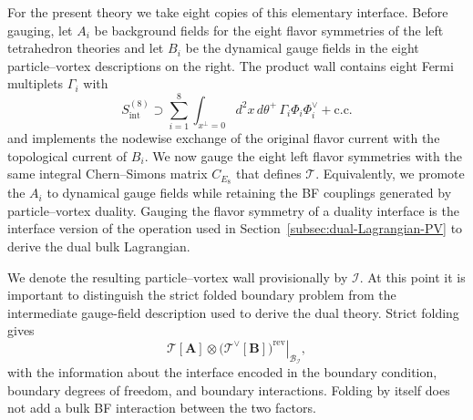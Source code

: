 \documentclass[11pt,a4paper]{article}
\numberwithin{equation}{section}
\begin{document}
For the present theory we take eight copies of this elementary interface.  Before gauging, let $A_i$ be background fields for the eight flavor symmetries of the left tetrahedron theories and let $B_i$ be the dynamical gauge fields in the eight particle--vortex descriptions on the right.  The product wall contains eight Fermi multiplets $\Gamma_i$ with
\begin{equation}
  S_{\mathrm{int}}^{(8)}
  \supset
  \sum_{i=1}^{8}
  \int_{x^\perp=0} d^2x\,d\theta^+\,
  \Gamma_i\Phi_i\Phi_i^\vee
  +\text{c.c.}
  \label{eq:eightfold-PV-wall-coupling}
\end{equation}
and implements the nodewise exchange of the original flavor current with the topological current of $B_i$.  We now gauge the eight left flavor symmetries with the same integral Chern--Simons matrix $C_{E_8}$ that defines $\mathcal T$.  Equivalently, we promote the $A_i$ to dynamical gauge fields while retaining the BF couplings generated by particle--vortex duality.  Gauging the flavor symmetry of a duality interface is the interface version of the operation used in Section~\ref{subsec:dual-Lagrangian-PV} to derive the dual bulk Lagrangian.

We denote the resulting particle--vortex wall provisionally by $\mathcal I$.  At this point it is important to distinguish the strict folded boundary problem from the intermediate gauge-field description used to derive the dual theory.  Strict folding gives
\[
  \left.
  \mathcal T[\boldsymbol A]\otimes
  \bigl(\mathcal T^\vee[\boldsymbol B]\bigr)^{\mathrm{rev}}
  \right|_{\mathcal B_{\mathcal I}},
\]
with the information about the interface encoded in the boundary condition, boundary degrees of freedom, and boundary interactions.  Folding by itself does not add a bulk BF interaction between the two factors.
\end{document}
